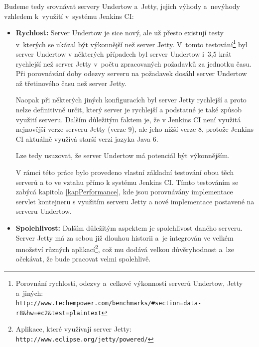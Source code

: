             \medskip
            Budeme tedy srovnávat servery Undertow a~Jetty, jejich výhody a~nevýhody
            vzhledem k~využití v~systému Jenkins CI:
            \begin{itemize}
                \item {\textbf{Rychlost:} Server Undertow je sice nový, ale už přesto existují
                    testy v~kterých se ukázal být výkonnější než server Jetty. V~tomto           
                    testování\footnote{Porovnání rychlosti, odezvy a~celkové výkonnosti serverů Undertow, Jetty a~jiných: 
                    \\\texttt{http://www.techempower.com/benchmarks/\#section=data-r8\&hw=ec2\&test=plaintext}}
                    byl server Undertow v některých případech byl server 
                    Undertow i~3,5 krát rychlejší než server Jetty v~počtu zpracovaných 
                    požadavků za jednotku času. Při porovnávání doby odezvy serveru na požadavek 
                    dosáhl server Undertow až třetinového času než server Jetty. 
                    
                    Naopak při některých
                    jiných konfiguracích byl server Jetty rychlejší a proto nelze definitivně určit,
                    který server je rychlejší a podstatné je také způsob využití serveru. 
                    Dalším důležitým faktem je, že v Jenkins CI není využitá nejnovější verze serveru
                    Jetty (verze 9), ale jeho nižší verze 8, protože Jenkins CI aktuálně využívá
                    starší verzi jazyka Java 6.
                    
                    Lze tedy usuzovat, že server Undertow má potenciál být výkonnějším.
        
                    V rámci této práce bylo provedeno vlastní základní testování 
                    obou těch serverů a to ve vztahu přímo k systému Jenkins CI. Tímto testováním
                    se zabýcá kapitola \ref{kapPerformance}, kde jsou porovnávány 
                    implementace servlet kontejneru s využitím serveru Jetty a nové implementace 
                    postavené na serveru Undertow.
                    }

                \item{\textbf{Spolehlivost:} Dalším důležitým aspektem je spolehlivost daného serveru. 
                        Server Jetty má za sebou již dlouhou historii a~je integrován ve velkém množství
                        různých aplikací\footnote{Aplikace, které využívají server Jetty: \texttt{http://www.eclipse.org/jetty/powered/}},
                        což mu dodává velkou důvěryhodnost a~lze očekávat, že bude pracovat velmi 
                        spolehlivě. 
                        
}
\end{itemize}
